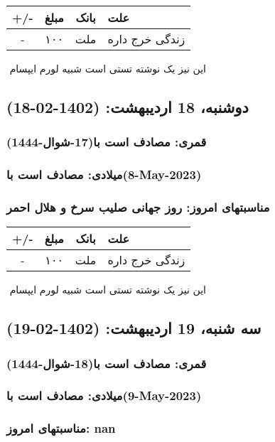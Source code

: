 \documentclass{article}
\newcommand{\rnote}[1]{\marginpar{\textcolor{color}{\StrSubstitute{\##1}{ }{\_}}}}
\newcommand{\myRow}[4]{
    #1 & #2 & #3 & #4 \\ \hline
}
\begin{document}
\begin{tabular}{ | c | c | c | p{5cm} |}
    \hline
    \myRow{ +/- }{مبلغ}{بانک}{علت}
    \myRow{-}{۱۰۰}{ملت}{زندگی خرج داره}
\end{tabular}
\newline
\newline

‌
\rnote{تست}
این نیز یک نوشته تستی است شبیه لورم ایپسام




\newpage
{}
\textcolor{color}{
\section{ دوشنبه، 18 اردیبهشت: (1402-02-18) }
\subsubsection*{قمری: مصادف است با(17-شوال-1444)} 
\subsubsection*{میلادی: مصادف است با(8-May-2023)}
\subsubsection*{مناسبتهای امروز: روز جهانی صلیب سرخ و هلال احمر}
}


\begin{tabular}{ | c | c | c | p{5cm} |}
    \hline
    \myRow{ +/- }{مبلغ}{بانک}{علت}
    \myRow{-}{۱۰۰}{ملت}{زندگی خرج داره}
\end{tabular}
\newline
\newline

‌
\rnote{تست}
این نیز یک نوشته تستی است شبیه لورم ایپسام




\newpage
{}
\textcolor{color}{
\section{ سه شنبه، 19 اردیبهشت: (1402-02-19) }
\subsubsection*{قمری: مصادف است با(18-شوال-1444)} 
\subsubsection*{میلادی: مصادف است با(9-May-2023)}
\subsubsection*{مناسبتهای امروز: nan}
}
\end{document}
